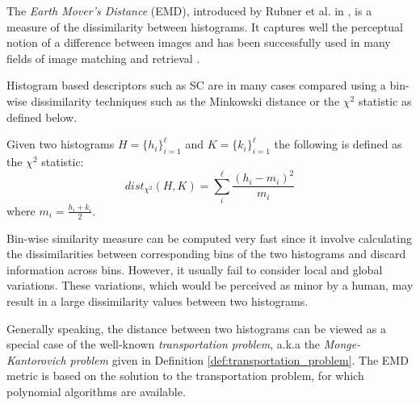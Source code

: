 \iftoggle{edit-mode}{\hspace{0pt}\marginpar{Introduction to EMD}}{}
The \emph{Earth Mover's Distance} (EMD), introduced by Rubner et al. in \cite{rubner2000earth}, is a measure of the dissimilarity between histograms. 
It captures well the perceptual notion of a difference between images and has been successfully used in many fields of image matching and retrieval \cite{grauman2004fast, rubner2000earth}.

\iftoggle{edit-mode}{\hspace{0pt}\marginpar{Binwise based measures}}{}
Histogram based descriptors such as SC are in many cases compared using a bin-wise dissimilarity techniques such as the Minkowski distance or the $\chi^2$ statistic as defined below.
 
\begin{definition}
Given two histograms $H=\{h_i\}_{i=1}^{\ell}$ and $K=\{k_i\}_{i=1}^{\ell}$ the following is defined as the $\chi^2$ statistic: 
\begin{equation}
dist_{\chi^2}(H,K)=\sum_{i}^{\ell} \frac{(h_i - m_i)^2}{m_i}
\end{equation}
where $m_i=\frac{h_i+k_i}{2}$.
\end{definition}

\iftoggle{edit-mode}{\hspace{0pt}\marginpar{Drawback of binwise based measures}}{}
Bin-wise similarity measure can be computed very fast since it involve calculating the dissimilarities between corresponding bins of the two histograms and discard information across bins. 
However, it usually fail to consider local and global variations. 
These variations, which would be perceived as minor by a human, may result in a large dissimilarity values between two histograms.

\iftoggle{edit-mode}{\hspace{0pt}\marginpar{The transportation problem}}{}
Generally speaking, the distance between two histograms can be viewed as a special case of the well-known \emph{transportation problem}, a.k.a the \emph{Monge-Kantorovich problem} \cite{rachev1985monge} given in Definition \ref{def:transportation_problem}. 
The EMD metric is based on the solution to the transportation problem, for which polynomial algorithms are available.


